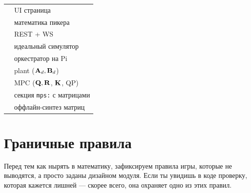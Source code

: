 \begin{codebox}[title={Где что лежит}]
\begin{tabular}{ll}
\filepath{compute\_node/frontend/src/pages/MpsPage.tsx} & UI страница\\
\filepath{compute\_node/frontend/src/lib/targetAngle.ts} & математика пикера\\
\filepath{compute\_node/dashboard/routers/mps.py}        & REST + WS\\
\filepath{compute\_node/mps\_runner.py}                  & идеальный симулятор\\
\filepath{pi\_nodes/nodes/mps\_node.py}                  & оркестратор на Pi\\
\filepath{pi\_nodes/control/state\_space\_model.py}      & plant ($\mathbf{A}_d, \mathbf{B}_d$)\\
\filepath{pi\_nodes/control/mpc\_controller.py}          & MPC ($\mathbf{Q}, \mathbf{R}$, $\mathbf{K}$, QP)\\
\filepath{config.yaml}                                   & секция \texttt{mps:} с матрицами\\
\filepath{matlab/main.m}                                 & оффлайн-синтез матриц\\
\end{tabular}
\end{codebox}

\section{Граничные правила}

Перед тем как нырять в математику, зафиксируем правила игры, которые
не выводятся, а просто заданы дизайном модуля. Если ты увидишь в коде
проверку, которая кажется лишней --- скорее всего, она охраняет одно
из этих правил.

